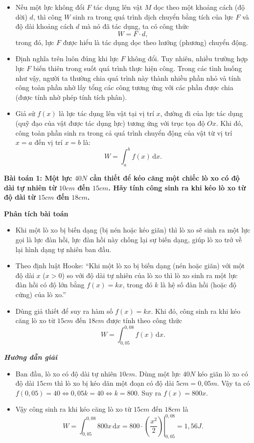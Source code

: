 \documentclass[12pt,a4paper]{article}
\newcommand{\dd}{\,\mathrm{d}}
\newcommand{\analysis}{\noindent\raisebox{0.15ex}{\rule{1.6ex}{1.6ex}}\hspace{4pt}\textbf{Phân tích bài toán}\par}
\newcommand{\solution}{\begin{center}\textbf{\textit{Hướng dẫn giải}}\end{center}\par}
\begin{document}
\begin{itemize}
\item Nếu một lực không đổi $F$ tác dụng lên vật $M$ dọc theo một khoảng cách (độ dời) $d$, thì công $W$ sinh ra trong quá trình dịch chuyển bằng tích của lực $F$ và độ dài khoảng cách $d$ mà nó đã tác dụng, ta có công thức
\[
W=F\cdot d,
\]
trong đó, lực $F$ được hiểu là tác dụng dọc theo hướng (phương) chuyển động.
\item Định nghĩa trên luôn đúng khi lực $F$ không đổi. Tuy nhiên, nhiều trường hợp lực $F$ biến thiên trong suốt quá trình thực hiện công. Trong các tình huống như vậy, người ta thường chia quá trình này thành nhiều phần nhỏ và tính công toàn phần nhờ lấy tổng các công tương ứng với các phần được chia (được tính nhờ phép tính tích phân).
\item Giả sử $f(x)$ là lực tác dụng lên vật tại vị trí $x$, đường đi của lực tác dụng (quỹ đạo của vật được tác dụng lực) tương ứng với trục tọa độ $Ox$. Khi đó, công toàn phần sinh ra trong cả quá trình chuyển động của vật từ vị trí $x=a$ đến vị trí $x=b$ là:
\[
W=\int_a^b f(x)\dd x.
\]
\end{itemize}

\textbf{Bài toán 1: Một lực $40N$ cần thiết để kéo căng một chiếc lò xo có độ dài tự nhiên từ $10cm$ đến $15cm$. Hãy tính công sinh ra khi kéo lò xo từ độ dài từ $15cm$ đến $18cm$.}\par\medskip

\begin{analysisbox}
\analysis
\begin{itemize}
\item Khi một lò xo bị biến dạng (bị nén hoặc kéo giãn) thì lò xo sẽ sinh ra một lực gọi là lực đàn hồi, lực đàn hồi này chống lại sự biến dạng, giúp lò xo trở về lại hình dạng tự nhiên ban đầu.
\item Theo định luật Hooke: “Khi một lò xo bị biến dạng (nén hoặc giãn) với một độ dài $x$ ($x>0$) so với độ dài tự nhiên của lò xo thì lò xo sinh ra một lực đàn hồi có độ lớn bằng $f(x)=kx$, trong đó $k$ là hệ số đàn hồi (hoặc độ cứng) của lò xo.”
\item Dùng giả thiết để suy ra hàm số $f(x)=kx$. Khi đó, công sinh ra khi kéo căng lò xo từ $15cm$ đến $18cm$ được tính theo công thức
\[
W=\int_{0,05}^{0,08}f(x)\dd x.
\]
\end{itemize}
\end{analysisbox}

\solution
\begin{itemize}
\item Ban đầu, lò xo có độ dài tự nhiên $10cm$. Dùng một lực $40N$ kéo giãn lò xo có độ dài $15cm$ thì lò xo bị kéo dãn một đoạn có độ dài $5cm=0,05m$. Vậy ta có
$f(0,05)=40\Leftrightarrow0,05k=40\Leftrightarrow k=800$. Suy ra $f(x)=800x$.
\item Vậy công sinh ra khi kéo căng lò xo từ $15cm$ đến $18cm$ là
\[
W=\int_{0,05}^{0,08}800x\dd x=800\cdot\left.\left(\frac{x^2}{2}\right)\right|_{0,05}^{0,08}=1,56J.
\]
\end{itemize}
\end{document}
